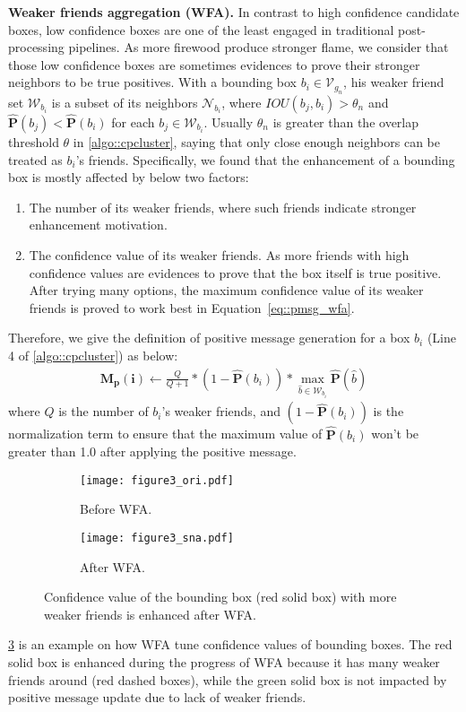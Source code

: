 \documentclass[10pt,twocolumn,letterpaper]{article}
\begin{document}
\textbf{Weaker friends aggregation (WFA).} In contrast to high confidence candidate boxes, low confidence boxes are one of the least engaged in traditional post-processing pipelines. As more firewood produce stronger flame, we consider that those low confidence boxes are sometimes evidences to prove their stronger neighbors to be true positives.
With a bounding box $b_i\in\mathcal{V}_{g_{n}}$, his weaker friend set $\mathcal{W}_{b_{i}}$ is a subset of its neighbors $\mathcal{N}_{b_{i}}$, where $IOU(b_{j},b_{i})>\theta_{n}$ and $\mathbf{\hat{P}}(b_j)<\mathbf{\hat{P}}(b_i)$ for each $b_{j}\in\mathcal{W}_{b_{i}}$.
Usually $\theta_{n}$ is greater than the overlap threshold $\theta$ in \cref{algo::cpcluster}, saying that only close enough neighbors can be treated as $b_i$'s friends.
Specifically, we found that the enhancement of a bounding box is mostly affected by below two factors:
\begin{enumerate}
  \item The number of its weaker friends, where such friends indicate stronger enhancement motivation.
  \item The confidence value of its weaker friends. As more friends with high confidence values are evidences to prove that the box itself is true positive. After trying many options, the maximum confidence value of its weaker friends is proved to work best in Equation~\eqref{eq::pmsg_wfa}.
\end{enumerate}
Therefore, we give the definition of positive message generation for a box $b_i$ (Line 4 of \cref{algo::cpcluster}) as below:
\begin{align}
  \mathbf{M_p(i)} \leftarrow \frac{Q}{Q+1} * (1-\mathbf{\hat{P}}(b_i)) * \max \limits_{\hat{b}\in\mathcal{W}_{b_{i}}}\mathbf{\hat{P}}(\hat{b}) \label{eq::pmsg_wfa}
\end{align}
where $Q$ is the number of $b_i$'s weaker friends, and $(1-\mathbf{\hat{P}}(b_i))$ is the normalization term to ensure that the maximum value of $\mathbf{\hat{P}}(b_i)$ won't be greater than 1.0 after applying the positive message.

\begin{figure}[h!]
  \centering
  \begin{subfigure}[b]{0.7\linewidth}
    \label{fig:sub_fig3a}
    \texttt{[image: figure3\_ori.pdf]}
    \caption{Before WFA.}
  \end{subfigure}
  \begin{subfigure}[b]{0.7\linewidth}
    \label{fig:sub_fig3b}
    \texttt{[image: figure3\_sna.pdf]}
    \caption{After WFA.}
  \end{subfigure}
  \caption{Confidence value of the bounding box (red solid box) with more weaker friends is enhanced after WFA.}
  \label{fig:wfa_example}
\end{figure}
\cref{fig:wfa_example} is an example on how WFA tune confidence values of bounding boxes. The red solid box is enhanced during the progress of WFA because it has many weaker friends around (red dashed boxes), while the green solid box is not impacted by positive message update due to lack of weaker friends.
\end{document}
